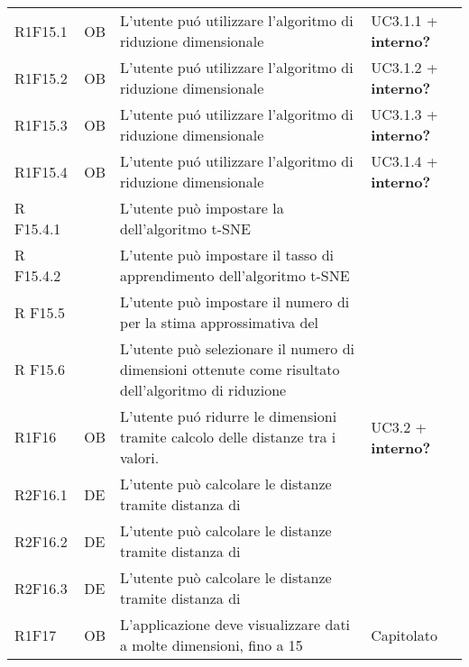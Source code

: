 {\begin{longtable}{C{2cm} | C{1.5cm} | C{9cm} | C{3.3cm}}
R1F15.1 & OB & L'utente puó utilizzare l'algoritmo di riduzione dimensionale  & UC3.1.1 + \textbf{interno?} \\
R1F15.2 & OB & L'utente puó utilizzare l'algoritmo di riduzione dimensionale  & UC3.1.2 + \textbf{interno?}\\
R1F15.3 & OB & L'utente puó utilizzare l'algoritmo di riduzione dimensionale  & UC3.1.3 + \textbf{interno?}\\
R1F15.4 & OB & L'utente puó utilizzare l'algoritmo di riduzione dimensionale  & UC3.1.4 + \textbf{interno?}\\
R F15.4.1 &  & L'utente può impostare la  dell'algoritmo t-SNE & \\
R F15.4.2 &  & L'utente può impostare il tasso di apprendimento dell'algoritmo t-SNE & \\
R F15.5 &  & L'utente può impostare il numero di  per la stima approssimativa del  & \\
R F15.6 &  & L'utente può selezionare il numero di dimensioni ottenute come risultato dell'algoritmo di riduzione & \\
R1F16 & OB & L'utente puó ridurre le dimensioni tramite calcolo delle distanze tra i valori. & UC3.2 + \textbf{interno?}\\ 
R2F16.1 & DE & L'utente può calcolare le distanze tramite distanza di  &  \\
R2F16.2 & DE & L'utente può calcolare le distanze tramite distanza di  &  \\
R2F16.3 & DE & L'utente può calcolare le distanze tramite distanza di  &  \\
R1F17 & OB & L'applicazione deve visualizzare dati a molte dimensioni, fino a 15 & Capitolato\\


\end{longtable}
}







